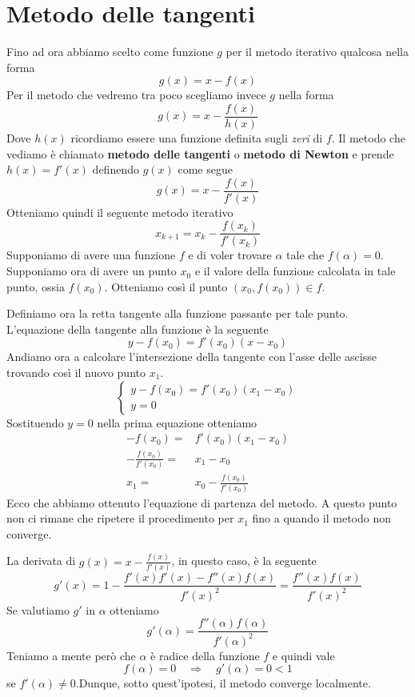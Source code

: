 \section{Metodo delle tangenti}
Fino ad ora abbiamo scelto come funzione $g$ per il metodo iterativo qualcosa nella forma
\[ g(x) = x - f(x) \]
Per il metodo che vedremo tra poco scegliamo invece $g$ nella forma
\[ g(x) = x - \frac{f(x)}{h(x)} \]
Dove $h(x)$ ricordiamo essere una funzione definita sugli \emph{zeri} di $f$. Il metodo che vediamo è chiamato
\textbf{metodo delle tangenti} o \textbf{metodo di Newton} e prende $h(x) = f'(x)$ definendo $g(x)$ come segue
\[ g(x) = x - \frac{f(x)}{f'(x)} \]
Otteniamo quindi il seguente metodo iterativo
\[ x_{k+1} = x_k - \frac{f(x_k)}{f'(x_k)} \]
Supponiamo di avere una funzione $f$ e di voler trovare $\alpha$ tale che $f(\alpha) = 0$. Supponiamo ora di
avere un punto $x_0$ e il valore della funzione calcolata in tale punto, ossia $f(x_0)$. Otteniamo così il
punto $(x_0, f(x_0)) \in f$.

Definiamo ora la retta tangente alla funzione passante per tale punto. L'equazione della tangente alla funzione
è la seguente
\[ y - f(x_0) = f'(x_0)(x - x_0) \]
Andiamo ora a calcolare l'intersezione della tangente con l'asse delle ascisse trovando così il nuovo punto $x_1$.
\[
	\begin{cases}
		y - f(x_0) = f'(x_0)(x_1 - x_0) \\
		y = 0
	\end{cases}
\]
Sostituendo $y = 0$ nella prima equazione otteniamo
\begin{align*}
	-f(x_0) =                 & f'(x_0)(x_1 - x_0)           \\
	-\frac{f(x_0)}{f'(x_0)} = & x_1 - x_0                    \\
	x_1 =                     & x_0 - \frac{f(x_0)}{f'(x_0)}
\end{align*}
Ecco che abbiamo ottenuto l'equazione di partenza del metodo. A questo punto non ci rimane che ripetere il
procedimento per $x_1$ fino a quando il metodo non converge.

La derivata di $g(x) = x - \frac{f(x)}{f'(x)}$, in questo caso, è la seguente
\[ g'(x) = 1 - \frac{f'(x) f'(x) - f''(x) f(x)}{f'(x)^2} = \frac{f''(x) f(x)}{f'(x)^2} \]
Se valutiamo $g'$ in $\alpha$ otteniamo
\[ g'(\alpha) = \frac{f''(\alpha) f(\alpha)}{f'(\alpha)^2} \]
Teniamo a mente però che $\alpha$ è radice della funzione $f$ e quindi vale
\[ f(\alpha) = 0 \quad \Rightarrow \quad g'(\alpha) = 0 < 1 \]
se $f'(\alpha) \neq 0$.Dunque, sotto quest'ipotesi, il metodo converge localmente.

